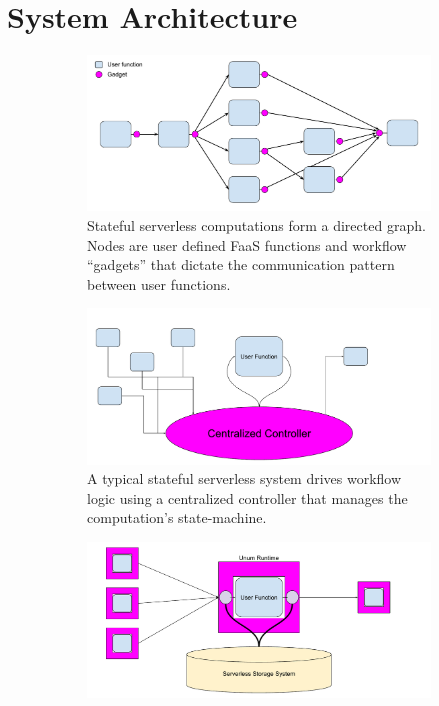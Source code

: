 \section{System Architecture}\label{sec:architecture}

\begin{figure}[t]
    \centering
    \begin{subfigure}[t]{0.7\textwidth}
        \includegraphics[width=\columnwidth]{figures/arch-abstract-graph.pdf}
        \caption{Stateful serverless computations form a directed graph. Nodes
                are user defined FaaS functions and workflow ``gadgets'' that dictate the
                communication pattern between user functions.}
        \label{fig:arch:graph}
    \end{subfigure}
    \begin{subfigure}[b]{\columnwidth}
        \includegraphics[width=\columnwidth]{figures/arch-controller.pdf}
        \caption{A typical stateful serverless system drives workflow logic
                 using a centralized controller that manages the computation's state-machine.}
        \label{fig:arch:centralized}
    \end{subfigure}
    \hfill
    \begin{subfigure}[b]{\columnwidth}
        \includegraphics[width=\columnwidth]{figures/arch-system.pdf}

\end{subfigure}
\end{figure}
